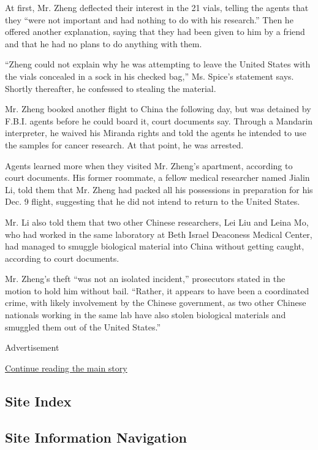 At first, Mr. Zheng deflected their interest in the 21 vials, telling
the agents that they ``were not important and had nothing to do with his
research.'' Then he offered another explanation, saying that they had
been given to him by a friend and that he had no plans to do anything
with them.

``Zheng could not explain why he was attempting to leave the United
States with the vials concealed in a sock in his checked bag,'' Ms.
Spice's statement says. Shortly thereafter, he confessed to stealing the
material.

Mr. Zheng booked another flight to China the following day, but was
detained by F.B.I. agents before he could board it, court documents say.
Through a Mandarin interpreter, he waived his Miranda rights and told
the agents he intended to use the samples for cancer research. At that
point, he was arrested.

Agents learned more when they visited Mr. Zheng's apartment, according
to court documents. His former roommate, a fellow medical researcher
named Jialin Li, told them that Mr. Zheng had packed all his possessions
in preparation for his Dec. 9 flight, suggesting that he did not intend
to return to the United States.

Mr. Li also told them that two other Chinese researchers, Lei Liu and
Leina Mo, who had worked in the same laboratory at Beth Israel Deaconess
Medical Center, had managed to smuggle biological material into China
without getting caught, according to court documents.

Mr. Zheng's theft ``was not an isolated incident,'' prosecutors stated
in the motion to hold him without bail. ``Rather, it appears to have
been a coordinated crime, with likely involvement by the Chinese
government, as two other Chinese nationals working in the same lab have
also stolen biological materials and smuggled them out of the United
States.''

Advertisement

\protect\hyperlink{after-bottom}{Continue reading the main story}

\hypertarget{site-index}{%
\subsection{Site Index}\label{site-index}}

\hypertarget{site-information-navigation}{%
\subsection{Site Information
Navigation}\label{site-information-navigation}}


